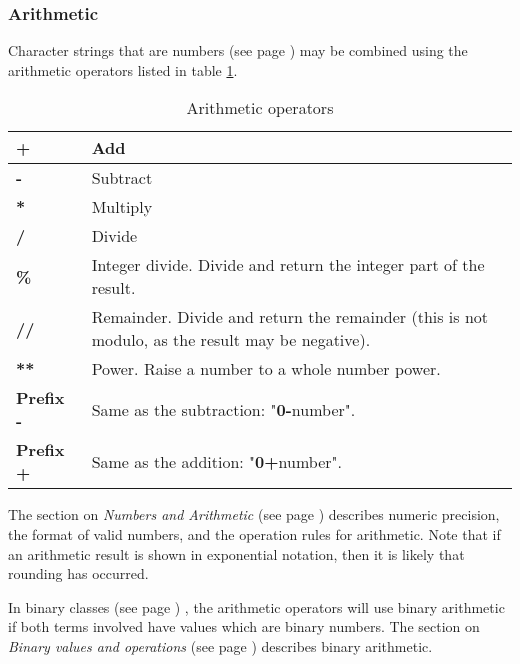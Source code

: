\subsubsection{Arithmetic}
\index{,}
\index{,}
\index{,}
\index{,}
Character strings that are  numbers (see page \pageref{refnumdef}) 
may be combined using the arithmetic operators listed in table \ref{table:Arithmetic operators}.
\begin{table}\caption{Arithmetic operators}\label{table:Arithmetic operators}
\begin{tabularx}{\textwidth}{>{\bfseries}lX}
\toprule
+&Add
\\\midrule
-&Subtract
\\\midrule
*&Multiply
\\\midrule
/&Divide
\\\midrule
\%&Integer divide. Divide and return the integer part of the result.
\\\midrule
//&Remainder. Divide and return the remainder (this is not modulo, as the result
may be negative).
\\\midrule
**&Power. Raise a number to a whole number power.
\\\midrule
Prefix -&Same as the subtraction: "\textbf{0-}number".
\\\midrule
Prefix +&Same as the addition: "\textbf{0+}number".
\\\bottomrule
\end{tabularx}
\end{table}
The section on  \emph{Numbers and Arithmetic} (see page \pageref{refnums}) 
describes numeric precision, the format of valid numbers, and the
operation rules for arithmetic.  Note that if an arithmetic result is
shown in exponential notation, then it is likely that rounding has
occurred.
 
In  binary classes (see page \pageref{refbincla}) , the arithmetic operators will use
binary arithmetic if both terms involved have values which are binary
numbers.
The section on  \emph{Binary values and operations} (see page \pageref{refbinary}) 
describes binary arithmetic.
